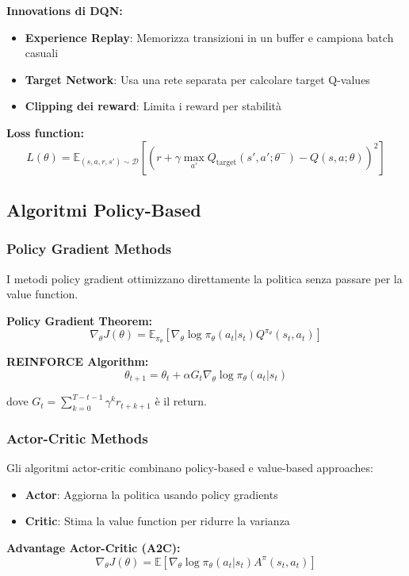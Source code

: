 \documentclass[12pt,a4paper,twoside]{report}
\begin{document}
\textbf{Innovations di DQN:}
\begin{itemize}
    \item \textbf{Experience Replay}: Memorizza transizioni in un buffer e campiona batch casuali
    \item \textbf{Target Network}: Usa una rete separata per calcolare target Q-values
    \item \textbf{Clipping dei reward}: Limita i reward per stabilità
\end{itemize}

\textbf{Loss function:}
$$L(\theta) = \mathbb{E}_{(s,a,r,s') \sim \mathcal{D}}[(r + \gamma \max_{a'} Q_{\text{target}}(s',a'; \theta^-) - Q(s,a; \theta))^2]$$

\subsection{Algoritmi Policy-Based}

\subsubsection{Policy Gradient Methods}

I metodi policy gradient ottimizzano direttamente la politica senza passare per la value function.

\textbf{Policy Gradient Theorem:}
$$\nabla_{\theta} J(\theta) = \mathbb{E}_{\pi_{\theta}}[\nabla_{\theta} \log \pi_{\theta}(a_t|s_t) Q^{\pi_{\theta}}(s_t, a_t)]$$

\textbf{REINFORCE Algorithm:}
$$\theta_{t+1} = \theta_t + \alpha G_t \nabla_{\theta} \log \pi_{\theta}(a_t|s_t)$$

dove $G_t = \sum_{k=0}^{T-t-1} \gamma^k r_{t+k+1}$ è il return.

\subsubsection{Actor-Critic Methods}

Gli algoritmi actor-critic combinano policy-based e value-based approaches:
\begin{itemize}
    \item \textbf{Actor}: Aggiorna la politica usando policy gradients
    \item \textbf{Critic}: Stima la value function per ridurre la varianza
\end{itemize}

\textbf{Advantage Actor-Critic (A2C):}
$$\nabla_{\theta} J(\theta) = \mathbb{E}[\nabla_{\theta} \log \pi_{\theta}(a_t|s_t) A^{\pi}(s_t, a_t)]$$
\end{document}
